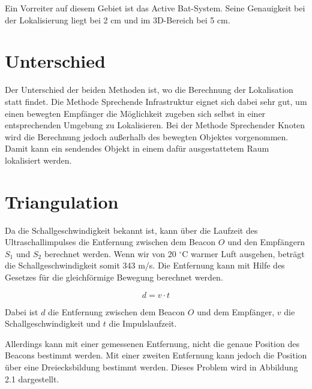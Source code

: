Ein Vorreiter auf diesem Gebiet ist das \dq Active Bat\dq -System. Seine
Genauigkeit bei der Lokalisierung liegt bei 2 cm und im 3D-Bereich bei 5 cm.

\section{Unterschied}
Der Unterschied der beiden Methoden ist, wo die Berechnung der Lokalisation
statt findet. Die Methode \dq Sprechende Infrastruktur\dq{} eignet sich dabei
sehr gut, um einen bewegten Empfänger die Möglichkeit zugeben sich selbst in
einer entsprechenden Umgebung zu Lokalisieren. Bei der Methode
\dq Sprechender Knoten\dq{} wird die Berechnung jedoch außerhalb des bewegten
Objektes vorgenommen. Damit kann ein sendendes Objekt in einem dafür
ausgestattetem Raum lokalisiert werden.

\section{Triangulation}
Da die Schallgeschwindigkeit bekannt ist, kann über die Laufzeit des
Ultraschallimpulses die Entfernung zwischen dem Beacon $O$ und den
Empfängern $S_1$ und $S_2$ berechnet werden. Wenn wir von 20 $^\circ$C warmer
Luft ausgehen, beträgt die Schallgeschwindigkeit somit 343 m/s. Die Entfernung
kann mit Hilfe des Gesetzes für die gleichförmige Bewegung berechnet werden.

\begin{equation}
  d = v\cdot t
\end{equation}

Dabei ist $d$ die Entfernung zwischen dem Beacon $O$ und dem Empfänger,
$v$ die Schallgeschwindigkeit und $t$ die Impulslaufzeit.

Allerdings kann mit einer gemessenen Entfernung, nicht die genaue Position des
Beacons bestimmt werden. Mit einer zweiten Entfernung
kann jedoch die Position über eine Dreiecksbildung bestimmt werden.
Dieses Problem wird in Abbildung 2.1 dargestellt.


